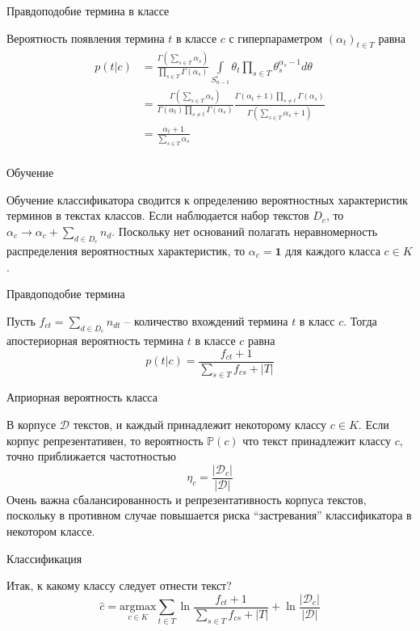 \documentclass{beamer}
\newcommand{\brac}[1]{\left ( #1 \right )}
\newcommand{\induc}[1]{\left . #1 \right \vert}
\newcommand{\abs}[1]{\left | #1 \right |}
\newcommand{\Dcal}{\mathcal{D}}
\begin{document}
\begin{frame}
  \begin{block}{Правдоподобие термина в классе}

    Вероятность появления термина $t$ в классе $c$ с гиперпараметром $\brac{\alpha_t}_{t\in T}$ равна
    \begin{align*}
      p\brac{\induc{t} c} &= \frac{\Gamma\brac{\sum_{s\in T}\alpha_s}}{\prod_{s\in T} \Gamma(\alpha_s)} \int\limits_{S_{n-1}^\circ} \theta_t \prod_{s\in T} \theta_s^{\alpha_s-1} d\theta \\
      &= \frac{\Gamma\brac{\sum_{s\in T}\alpha_s}}{\Gamma(\alpha_t) \prod_{s\neq t} \Gamma(\alpha_s)} \frac{\Gamma(\alpha_t+1) \prod_{s\neq t} \Gamma(\alpha_s)}{\Gamma\brac{\sum_{s\in T}\alpha_s + 1}}\\
      &= \frac{\alpha_t+1}{\sum_{s\in T}\alpha_s}\\
    \end{align*}
  \end{block}
\end{frame}

\begin{frame}
  \begin{block}{Обучение}

    Обучение классификатора сводится к определению вероятностных характеристик терминов в текстах классов.
    Если наблюдается набор текстов $D_c$, то $\alpha_c \to \alpha_c + \sum_{d\in D_c}n_d$.
    Поскольку нет оснований полагать неравномерность распределения вероятностных характеристик, то $\alpha_c = \mathbf{1}$ для каждого класса $c\in K$.
  \end{block}
  \begin{block}{Правдоподобие термина}

    Пусть $f_{ct} = \sum_{d\in D_c} n_{dt}$ -- количество вхождений термина $t$ в класс $c$.
    Тогда апостериорная вероятность термина $t$ в классе $c$ равна
    \[p\brac{\induc{t}c} = \frac{ f_{ct} + 1}{ \sum_{s\in T}f_{cs} + \abs{T}}\]
  \end{block}
\end{frame}

\begin{frame}
  \begin{block}{Априорная вероятность класса}

    В корпусе $\Dcal$ текстов, и каждый принадлежит некоторому классу $c\in K$. Если корпус репрезентативен, то вероятность $\mathbb{P}(c)$ что текст принадлежит классу $c$, точно приближается частотностью
    \[\eta_c = \frac{\abs{\Dcal_c}}{\abs{\Dcal}}\]
    Очень важна сбалансированность и репрезентативность корпуса текстов, поскольку в противном случае повышается риска ``застревания'' классификатора в некотором классе.
  \end{block}
  \begin{block}{Классификация}

    Итак, к какому классу следует отнести текст?
    \[\hat{c} = \underset{c\in K}{\text{argmax}} \sum_{t\in T} \ln \frac{f_{ct} + 1}{\sum_{s\in T}f_{cs} + \abs{T}} + \ln\frac{\abs{\Dcal_c}}{\abs{\Dcal}}\]
  \end{block}
\end{frame}
\end{document}
